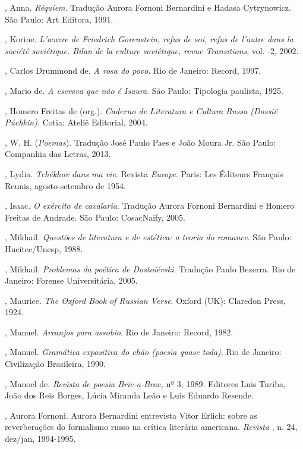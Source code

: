 \begin{Parskip}
{\small
{}, Anna. \emph{Réquiem}. Tradução Aurora Fornoni Bernardini e Hadasa Cytrynowicz. São Paulo: Art Editora, 1991.

, Korine. \emph{L’œuvre de Friedrich Gorenstein, refus de soi, refus de l'autre dans la société
 soviétique. Bilan de la culture soviétique, revue Transitions}, vol. -2, 2002.

, Carlos Drummond de. \emph{A rosa do povo}. Rio de Janeiro:
Record, 1997.

, Mario de. \emph{A escrava que não é Isaura}. São Paulo: Tipologia paulista, 1925.

, Homero Freitas de (org.). \emph{Caderno de Literatura e Cultura
Russa (Dossiê Púchkin)}. Cotia: Ateliê Editorial, 2004.

, W. H. \emph{} (\emph{Poemas}). Tradução José Paulo Paes e
João Moura Jr. São Paulo: Companhia das Letras, 2013.

, Lydia. \emph{Tchékhov dans ma vie}. Revista \emph{Europe}.
Paris: Les Éditeurs Français Reunis, agosto-setembro de 1954.

, Isaac. \emph{O exército de cavalaria}. Tradução Aurora Fornoni Bernardini e Homero Freitas de
Andrade. São Paulo: CosacNaify, 2005.

, Mikhail. \emph{Questões de literatura e de estética: a teoria do romance}. São Paulo: Hucitec/Unesp, 1988.

, Mikhail. \emph{Problemas da poética de Dostoiévski}. Tradução Paulo
Bezerra. Rio de Janeiro: Forense Universitária, 2005.

, Maurice. \emph{The Oxford Book of
Russian Verse}. Oxford (UK): Claredon Press, 1924. 

, Manuel. \emph{Arranjos para assobio}. Rio de Janeiro: Record, 1982.

, Manuel. \emph{Gramática expositiva do chão (poesia quase toda)}.
Rio de Janeiro: Civilização Brasileira, 1990.

, Manoel de. \emph{Revista de poesia Bric-a-Brac,} nº 3, 1989. Editores
Luis Turiba, João dos Reis Borges, Lúcia Miranda Leão e Luis Eduardo Resende.

, Aurora Fornoni. Aurora Bernardini entrevista Vitor Erlich: sobre as reverberações do formalismo russo na crítica literária americana. \emph{Revista }, n. 24, dez/jan, 1994-1995.

}
\end{Parskip}
